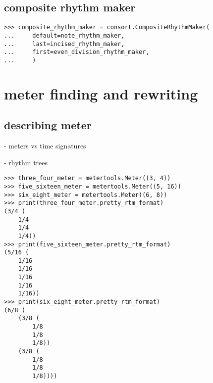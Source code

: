 \subsection{composite rhythm maker}

\begin{comment}
<abjad>
composite_rhythm_maker = consort.CompositeRhythmMaker(
    default=note_rhythm_maker,
    last=incised_rhythm_maker,
    first=even_division_rhythm_maker,
    )
</abjad>
\end{comment}

\begin{singlespacing}
\begin{lstlisting}
>>> composite_rhythm_maker = consort.CompositeRhythmMaker(
...     default=note_rhythm_maker,
...     last=incised_rhythm_maker,
...     first=even_division_rhythm_maker,
...     )
\end{lstlisting}
\end{singlespacing}

\section{meter finding and rewriting}

\subsection{describing meter}

- meters vs time signatures

- rhythm trees

\begin{comment}
<abjad>
three_four_meter = metertools.Meter((3, 4))
five_sixteen_meter = metertools.Meter((5, 16))
six_eight_meter = metertools.Meter((6, 8))
print(three_four_meter.pretty_rtm_format)
print(five_sixteen_meter.pretty_rtm_format)
print(six_eight_meter.pretty_rtm_format)
</abjad>
\end{comment}

\begin{singlespacing}
\begin{lstlisting}
>>> three_four_meter = metertools.Meter((3, 4))
>>> five_sixteen_meter = metertools.Meter((5, 16))
>>> six_eight_meter = metertools.Meter((6, 8))
>>> print(three_four_meter.pretty_rtm_format)
(3/4 (
	1/4
	1/4
	1/4))
>>> print(five_sixteen_meter.pretty_rtm_format)
(5/16 (
	1/16
	1/16
	1/16
	1/16
	1/16))
>>> print(six_eight_meter.pretty_rtm_format)
(6/8 (
	(3/8 (
		1/8
		1/8
		1/8))
	(3/8 (
		1/8
		1/8
		1/8))))
\end{lstlisting}
\end{singlespacing}

